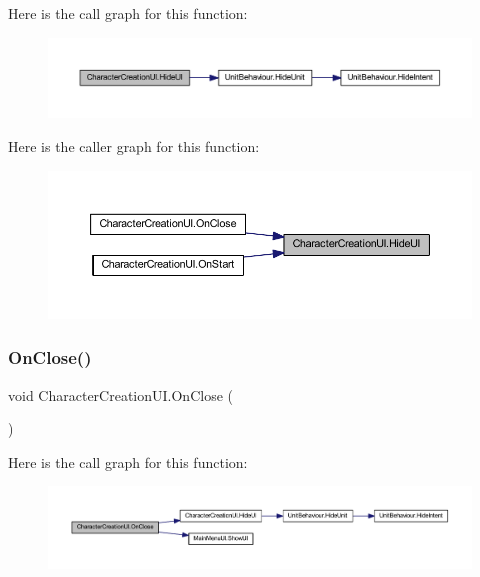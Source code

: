 Here is the call graph for this function\+:
\nopagebreak
\begin{figure}[H]
\begin{center}
\leavevmode
\includegraphics[width=350pt]{class_character_creation_u_i_a1724d7136e40f03376f720ec0ecb2d83_cgraph}
\end{center}
\end{figure}
Here is the caller graph for this function\+:
\nopagebreak
\begin{figure}[H]
\begin{center}
\leavevmode
\includegraphics[width=350pt]{class_character_creation_u_i_a1724d7136e40f03376f720ec0ecb2d83_icgraph}
\end{center}
\end{figure}
\mbox{\label{class_character_creation_u_i_a3a3792f0c251839acb08848c3bf0e6e0}} 
\subsubsection{\texorpdfstring{OnClose()}{OnClose()}}
{\footnotesize\ttfamily void Character\+Creation\+U\+I.\+On\+Close (\begin{DoxyParamCaption}{ }\end{DoxyParamCaption})}

Here is the call graph for this function\+:
\nopagebreak
\begin{figure}[H]
\begin{center}
\leavevmode
\includegraphics[width=350pt]{class_character_creation_u_i_a3a3792f0c251839acb08848c3bf0e6e0_cgraph}
\end{center}
\end{figure}
\mbox{\label{class_character_creation_u_i_a07db6ab68cff5c8d43ed3809e45efe0c}} 

